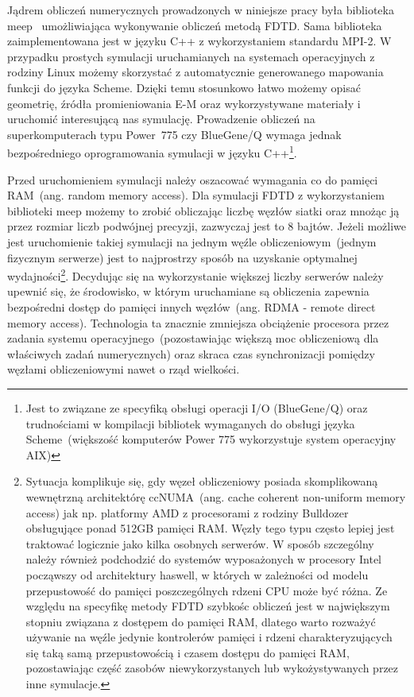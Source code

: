 Jądrem obliczeń numerycznych prowadzonych w niniejsze pracy była biblioteka meep~\cite{OskooiRo10} umożliwiająca wykonywanie obliczeń metodą FDTD. Sama biblioteka zaimplementowana jest w języku C++ z wykorzystaniem standardu MPI-2. W przypadku prostych symulacji uruchamianych na systemach operacyjnych z rodziny Linux możemy skorzystać z automatycznie generowanego mapowania funkcji do języka Scheme. Dzięki temu stosunkowo łatwo możemy opisać geometrię, źródła promieniowania E-M oraz wykorzystywane materiały i uruchomić interesującą nas symulację. Prowadzenie obliczeń na superkomputerach typu Power~775 czy BlueGene/Q wymaga jednak bezpośredniego oprogramowania symulacji w języku C++\footnote{Jest to związane ze specyfiką obsługi operacji I/O (BlueGene/Q) oraz trudnościami w kompilacji bibliotek wymaganych do obsługi języka Scheme~(większość komputerów Power 775 wykorzystuje system operacyjny AIX)}. 

Przed uruchomieniem symulacji należy oszacować wymagania co do pamięci RAM~(ang. random memory access). Dla symulacji FDTD z wykorzystaniem biblioteki meep możemy to zrobić obliczając liczbę węzłów siatki oraz mnożąc ją przez rozmiar liczb podwójnej precyzji, zazwyczaj jest to 8 bajtów. Jeżeli możliwe jest uruchomienie takiej symulacji na jednym węźle obliczeniowym~(jednym fizycznym serwerze) jest to najprostrzy sposób na uzyskanie optymalnej wydajności\footnote{Sytuacja komplikuje się, gdy węzeł obliczeniowy posiada skomplikowaną wewnętrzną architektórę ccNUMA~(ang. cache coherent non-uniform memory access) jak np. platformy AMD z procesorami z rodziny Bulldozer obsługujące ponad 512GB pamięci RAM. Węzły tego typu często lepiej jest traktować logicznie jako kilka osobnych serwerów. W sposób szczególny należy również podchodzić do systemów wyposażonych w procesory Intel począwszy od architektury haswell, w których w zależności od modelu przepustowość do pamięci poszczególnych rdzeni CPU może być różna. Ze względu na specyfikę metody FDTD szybkośc obliczeń jest w największym stopniu związana z dostępem do pamięci RAM, dlatego warto rozważyć używanie na węźle jedynie kontrolerów pamięci i rdzeni charakteryzujących się taką samą przepustowością i czasem dostępu do pamięci RAM, pozostawiając część zasobów niewykorzystanych lub wykożystywanych przez inne symulacje.}. Decydując się na wykorzystanie większej liczby serwerów należy upewnić się, że środowisko, w którym uruchamiane są obliczenia zapewnia bezpośredni dostęp do pamięci innych węzłów~(ang. RDMA - remote direct memory access). Technologia ta znacznie zmniejsza obciążenie procesora przez zadania systemu operacyjnego~(pozostawiając większą moc obliczeniową dla właściwych zadań numerycznych) oraz skraca czas synchronizacji pomiędzy węzłami obliczeniowymi nawet o rząd wielkości. 


